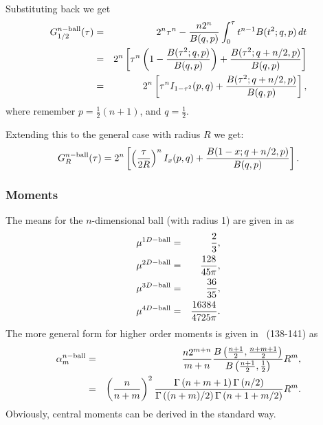 Substituting back we get
\begin{eqnarray}
   G^{n-{\rm ball}}_{1/2}(\tau)
       & = &  2^n \tau^{n} 
            - \frac{n 2^n}{B(q,p)} \int_0^\tau t^{n-1}   B(t^2; q,p) \, dt  \nonumber \\
       & = &  2^n \left[ \tau^{n} \left(1-   \frac{B(\tau^2; q,p)}{B(q,p)} \right)
                           + \frac{B(\tau^2; q+n/2,p)}{B(q,p)} \right] \nonumber \\
       & = &  2^n \left[ \tau^{n} I_{1-\tau^2}(p,q)  + \frac{B(\tau^2; q+n/2,p)}{B(q,p)} \right],
\end{eqnarray}
where remember $p = \frac{1}{2} (n+1)$, and $q=\frac{1}{2}$.

Extending this to the general case with radius $R$ we get:
\begin{equation}
  \label{eq:cdf_n-ball}  
   G^{n-{\rm ball}}_{R}(\tau)
     =  2^n \left[ \left( \frac{\tau}{2R} \right)^{n} I_{x}(p,q)  + \frac{B(1-x; q+n/2,p)}{B(q,p)} \right].
\end{equation}

\subsubsection{Moments}

The means for the $n$-dimensional ball (with radius 1) are given in
\cite{weisstein:_ball_line_picking} as
\begin{eqnarray}
  \label{eq:ball-ndim-mean}
  \mu^{1D-{\rm ball}} & = & \frac{2}{3}, \\
  \mu^{2D-{\rm ball}} & = & \frac{128}{45 \pi},\\
  \mu^{3D-{\rm ball}} & = & \frac{36}{35}, \\
  \mu^{4D-{\rm ball}} & = & \frac{16384}{4725 \pi}.
\end{eqnarray}
The more general form for higher order moments is given in
\cite{tu00:_circle_line}~(138-141) as
\begin{eqnarray}
  \label{eq:ball-ndim-moments}
  \alpha_m^{n-{\rm ball}} & = &
     \frac{n 2^{m+n}}{m+n} \frac{B\left(\frac{n+1}{2}, \frac{n+m+1}{2}  \right)}{B\left(\frac{n+1}{2}, \frac{1}{2} \right)} R^m, \\
       & = & \left( \frac{n}{n+m} \right)^2 
                 \frac{\Gamma\left( n+m+1 \right) \Gamma\left( n/2 \right) }
                      {\Gamma\left( (n+m)/2 \right) \Gamma\left( n+1 + m/2 \right) } R^m.  
\end{eqnarray}
Obviously, central moments can be derived in the standard way.





